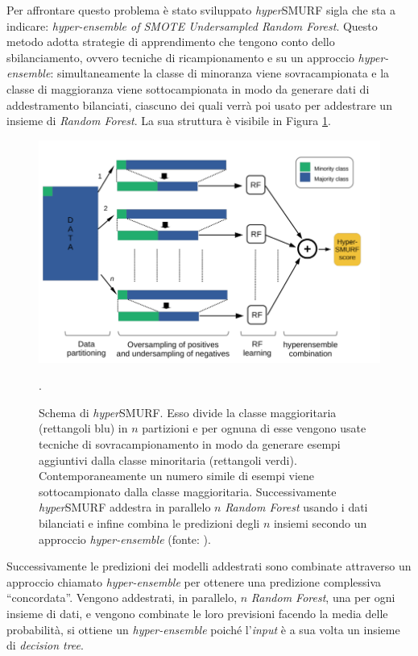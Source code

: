 \documentclass[12pt,italian]{report}
\begin{document}
	Per affrontare questo problema è stato sviluppato \textit{hyper}SMURF \cite{Schubach2017} sigla che sta a indicare: \textit{hyper-ensemble of SMOTE Undersampled Random Forest}. Questo metodo adotta strategie di apprendimento che tengono conto dello sbilanciamento, ovvero tecniche di ricampionamento e su un approccio \textit{hyper-ensemble}: simultaneamente la classe di minoranza viene sovracampionata e la classe di maggioranza viene sottocampionata in modo da generare dati di addestramento bilanciati, ciascuno dei quali verrà poi usato per addestrare un insieme di \textit{Random Forest}. La sua struttura è visibile in Figura \ref{fig:hypersmurf}.
	\begin{figure}[h!]
		\centering
		\includegraphics[width=0.7\linewidth]{immagini/hyperSMURF}
		\caption{Schema di \textit{hyper}SMURF. Esso divide la classe maggioritaria (rettangoli blu) in $n$ partizioni e per ognuna di esse vengono usate tecniche di sovracampionamento in modo da generare esempi aggiuntivi dalla classe minoritaria (rettangoli verdi). Contemporaneamente un numero simile di esempi viene sottocampionato dalla classe maggioritaria. Successivamente \textit{hyper}SMURF addestra in parallelo $n$ \textit{Random Forest} usando i dati bilanciati e infine combina le predizioni degli $n$ insiemi secondo un approccio \textit{hyper-ensemble} (fonte: \cite{Schubach2017}).}.
		\label{fig:hypersmurf}
	\end{figure}

	Successivamente le predizioni dei modelli addestrati sono combinate attraverso un approccio chiamato \textit{hyper-ensemble} per ottenere una predizione complessiva ``concordata''. Vengono addestrati, in parallelo, $n$ \textit{Random Forest}, una per ogni insieme di dati, e vengono combinate le loro previsioni facendo la media delle probabilità, si ottiene un \textit{hyper-ensemble} poiché l'\textit{input} è a sua volta un insieme di \textit{decision tree}. 
	
\end{document}
